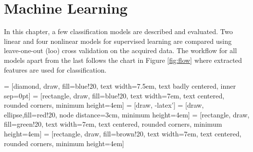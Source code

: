 \chapter{Machine Learning}

In this chapter, a few classification models are described and evaluated. Two linear and four nonlinear models for supervised learning are compared using leave-one-out (\gls{loo}) cross validation on the acquired data. The workflow for all models apart from the last follows the chart in Figure \ref{fig:flow} where extracted features are used for classification.

 = [diamond, draw, fill=blue!20, 
    text width=7.5em, text badly centered, inner sep=0pt]
 = [rectangle, draw, fill=blue!20, 
    text width=7em, text centered, rounded corners, minimum height=4em]
 = [draw, -latex']
 = [draw, ellipse,fill=red!20, node distance=3cm,
    minimum height=4em]
 = [rectangle, draw, fill=green!20, 
    text width=7em, text centered, rounded corners, minimum height=4em]
 = [rectangle, draw, fill=brown!20, 
    text width=7em, text centered, rounded corners, minimum height=4em]

